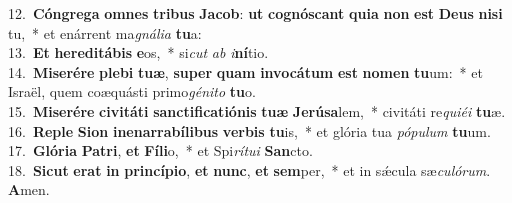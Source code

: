 {12.~}\textbf{Cón}\textbf{gre}\textbf{ga} \textbf{om}\textbf{nes} \textbf{tri}\textbf{bus} \textbf{Ja}\textbf{cob}: \textbf{ut} \textbf{co}\textbf{gnó}\textbf{scant} \textbf{qui}\textbf{a} \textbf{non} \textbf{est} \textbf{De}\textbf{us} \textbf{ni}\textbf{si} tu,~* et enárrent ma\textit{gná}\textit{li}\textit{a} \textbf{tu}a:\\
{13.~}\textbf{Et} \textbf{he}\textbf{re}\textbf{di}\textbf{tá}\textbf{bis} \textbf{e}os,~* si\textit{cut} \textit{ab} \textit{i}\textbf{ní}tio.\\
{14.~}\textbf{Mi}\textbf{se}\textbf{ré}\textbf{re} \textbf{ple}\textbf{bi} \textbf{tu}\textbf{æ}, \textbf{su}\textbf{per} \textbf{quam} \textbf{in}\textbf{vo}\textbf{cá}\textbf{tum} \textbf{est} \textbf{no}\textbf{men} \textbf{tu}um:~* et Israël, quem coæquásti primo\textit{gé}\textit{ni}\textit{to} \textbf{tu}o.\\
{15.~}\textbf{Mi}\textbf{se}\textbf{ré}\textbf{re} \textbf{ci}\textbf{vi}\textbf{tá}\textbf{ti} \textbf{san}\textbf{cti}\textbf{fi}\textbf{ca}\textbf{ti}\textbf{ó}\textbf{nis} \textbf{tu}\textbf{æ} \textbf{Je}\textbf{rú}\textbf{sa}lem,~* civitáti re\textit{qui}\textit{é}\textit{i} \textbf{tu}æ.\\
{16.~}\textbf{Re}\textbf{ple} \textbf{Si}\textbf{on} \textbf{i}\textbf{ne}\textbf{nar}\textbf{ra}\textbf{bí}\textbf{li}\textbf{bus} \textbf{ver}\textbf{bis} \textbf{tu}is,~* et glória tua \textit{pó}\textit{pu}\textit{lum} \textbf{tu}um.\\
{17.~}\textbf{Gló}\textbf{ri}\textbf{a} \textbf{Pa}\textbf{tri}, \textbf{et} \textbf{Fí}\textbf{li}o,~* et Spi\textit{rí}\textit{tu}\textit{i} \textbf{San}cto.\\
{18.~}\textbf{Si}\textbf{cut} \textbf{e}\textbf{rat} \textbf{in} \textbf{prin}\textbf{cí}\textbf{pi}\textbf{o}, \textbf{et} \textbf{nunc}, \textbf{et} \textbf{sem}per,~* et in sǽcula sæ\textit{cu}\textit{ló}\textit{rum}. \textbf{A}men.\\
